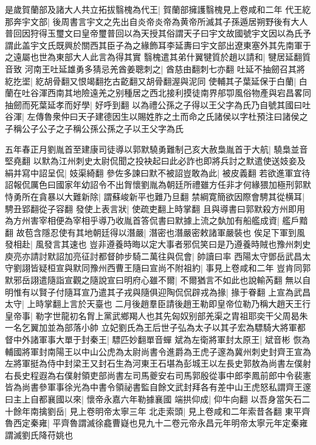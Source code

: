 是歲賀蘭部及諸大人共立拓拔翳槐為代王|{
	賀蘭部擁護翳槐見上卷咸和二年}
代王紇那奔宇文部|{
	後周書言宇文之先出自炎帝炎帝為黄帝所滅其子孫遁居朔野後有大人普回因狩得玉璽文曰皇帝璽普回以為天授其俗謂天子曰宇文故國號宇文因以為氏予謂此盖宇文氏既興於關西其臣子為之緣飾耳李延夀曰宇文部出遼東塞外其先南軍于之遠屬也世為東部大人此言為得其實}
翳槐遣其弟什翼犍質於趙以請和|{
	犍居延翻質音致}
河南王吐延雄勇多猜忌羌酋姜聰刺之|{
	酋慈由翻刺七亦翻}
吐延不抽劒召其將紇扢埿|{
	紇胡骨翻又恨竭翻扢古齕翻又胡骨翻渥與泥同}
使輔其子葉延保于白蘭|{
	白蘭在吐谷渾西南其地險遠羌之别種居之西北接利摸徒南界郍卾風俗物產與宕昌畧同}
抽劒而死葉延孝而好學|{
	好呼到翻}
以為禮公孫之子得以王父字為氏乃自號其國曰吐谷渾|{
	左傳魯衆仲曰天子建德因生以賜姓胙之土而命之氏諸侯以字杜預注曰諸侯之子稱公子公子之子稱公孫公孫之子以王父字為氏}


五年春正月劉胤首至建康司徒導以郭默驍勇難制己亥大赦梟胤首于大航|{
	驍梟並音堅堯翻}
以默為江州刺史太尉侃聞之投袂起曰此必詐也即將兵討之默遣使送妓妾及絹并寫中詔呈侃|{
	妓渠綺翻}
參佐多諫曰默不被詔豈敢為此|{
	被皮義翻}
若欲進軍宜待詔報侃厲色曰國家年幼詔令不出胷懷劉胤為朝廷所禮雖方任非才何緣猥加極刑郭默恃勇所在貪暴以大難新除|{
	謂蘇峻新平也難乃旦翻}
禁綱寛簡欲因際會騁其從横耳|{
	騁丑郢翻從子容翻}
發使上表言狀|{
	使疏吏翻上時掌翻}
且與導書曰郭默殺方州即用為方州害宰相便為宰相乎導乃收胤首答侃書曰默據上流之埶加有船艦成資|{
	艦戶黯翻}
故苞含隱忍使有其地朝廷得以潛嚴|{
	潛密也潛嚴密敕諸軍嚴裝也}
俟足下軍到風發相赴|{
	風發言其速也}
豈非遵養時晦以定大事者邪侃笑曰是乃遵養時賊也豫州刺史庾亮亦請討默詔加亮征討都督帥步騎二萬往與侃會|{
	帥讀曰率}
西陽太守鄧岳武昌太守劉詡皆疑桓宣與默同豫州西曹王隨曰宣尚不附祖約|{
	事見上卷咸和二年}
豈肯同郭默邪岳詡遣隨詣宣觀之隨說宣曰明府心雖不爾|{
	不爾猶言不如此也說輸芮翻}
無以自明惟有以賢子付隨耳宣乃遣其子戎與隨俱迎陶侃侃辟戎為掾|{
	掾于眷翻}
上宣為武昌太守|{
	上時掌翻上言於天臺也}
二月後趙羣臣請後趙王勒即皇帝位勒乃稱大趙天王行皇帝事|{
	勒字世龍初名胷上黨武鄉羯人也其先匈奴别部羌渠之胄祖耶奕干父周曷朱一名乞翼加並為部落小帥}
立妃劉氏為王后世子弘為太子以其子宏為驃騎大將軍都督中外諸軍事大單于封秦王|{
	驃匹妙翻單音蟬}
斌為左衛將軍封太原王|{
	斌音彬}
恢為輔國將軍封南陽王以中山公虎為太尉尚書令進爵為王虎子邃為冀州刺史封齊王宣為左將軍挺為侍中封梁王又封石生為河東王石堪為彭城王以左長史郭敖為尚書左僕射右長史程遐為右僕射領吏部尚書左司馬夔安右司馬郭殷從事中郎李鳳前郎中令裴憲皆為尚書參軍事徐光為中書令領祕書監自餘文武封拜各有差中山王虎怒私謂齊王邃曰主上自都襄國以來|{
	懷帝永嘉六年勒據襄國}
端拱仰成|{
	仰牛向翻}
以吾身當矢石二十餘年南擒劉岳|{
	見上卷明帝太寧三年}
北走索頭|{
	見上卷咸和二年索昔各翻}
東平齊魯西定秦雍|{
	平齊魯謂滅徐龕曹嶷也見九十二卷元帝永昌元年明帝太寧元年定秦雍謂滅劉氏降苻姚也}
